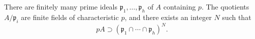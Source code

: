 There are finitely many prime ideals $\mathfrak{p}_1, \ldots, \mathfrak{p}_h$ of $A$ containing $p$. The quotients $A/\mathfrak{p}_i$ are finite fields of characteristic $p$, and there exists an integer $N$ such that
$$pA \supset (\mathfrak{p}_1 \cap \cdots \cap \mathfrak{p}_h)^N.$$

